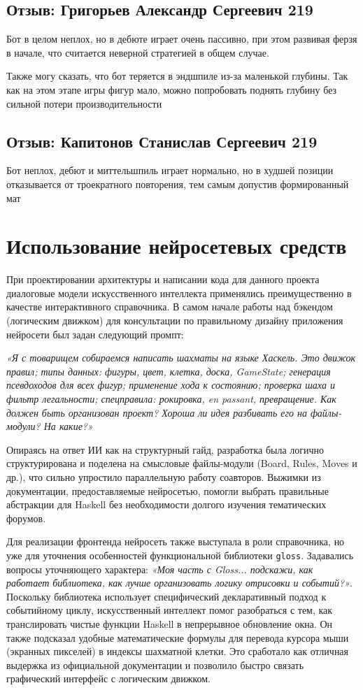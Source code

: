 \subsection{Отзыв: Григорьев Александр Сергеевич 219}
Бот в целом неплох, но в дебюте играет очень пассивно, при этом развивая ферзя в начале, что считается неверной стратегией в общем случае.

Также могу сказать, что бот теряется в эндшпиле из-за маленькой глубины. Так как на этом этапе игры фигур мало, можно попробовать поднять глубину без сильной потери производительности

\subsection{Отзыв: Капитонов Станислав Сергеевич 219}
Бот неплох, дебют и миттельшпиль играет нормально, но в худшей позиции отказывается от троекратного повторения, тем самым допустив формированный мат

\section{Использование нейросетевых средств}
При проектировании архитектуры и написании кода для данного проекта диалоговые модели искусственного интеллекта применялись преимущественно в качестве интерактивного справочника. В самом начале работы над бэкендом (логическим движком) для консультации по правильному дизайну приложения нейросети был задан следующий промпт: 

\textit{«Я с товарищем собираемся написать шахматы на языке Хаскель. Это движок правил; типы данных: фигуры, цвет, клетка, доска, GameState; генерация псевдоходов для всех фигур; применение хода к состоянию; проверка шаха и фильтр легальности; спецправила: рокировка, en passant, превращение. Как должен быть организован проект? Хороша ли идея разбивать его на файлы-модули? На какие?»}

Опираясь на ответ ИИ как на структурный гайд, разработка была логично структурирована и поделена на смысловые файлы-модули (Board, Rules, Moves и др.), что сильно упростило параллельную работу соавторов. Выжимки из документации, предоставляемые нейросетью, помогли выбрать правильные абстракции для Haskell без необходимости долгого изучения тематических форумов.

Для реализации фронтенда нейросеть также выступала в роли справочника, но уже для уточнения особенностей функциональной библиотеки \texttt{gloss}. Задавались вопросы уточняющего характера: \textit{«Моя часть с Gloss... подскажи, как работает библиотека, как лучше организовать логику отрисовки и событий?»}. Поскольку библиотека использует специфический декларативный подход к событийному циклу, искусственный интеллект помог разобраться с тем, как транслировать чистые функции Haskell в непрерывное обновление окна. Он также подсказал удобные математические формулы для перевода курсора мыши (экранных пикселей) в индексы шахматной клетки. Это сработало как отличная выдержка из официальной документации и позволило быстро связать графический интерфейс с логическим движком.

